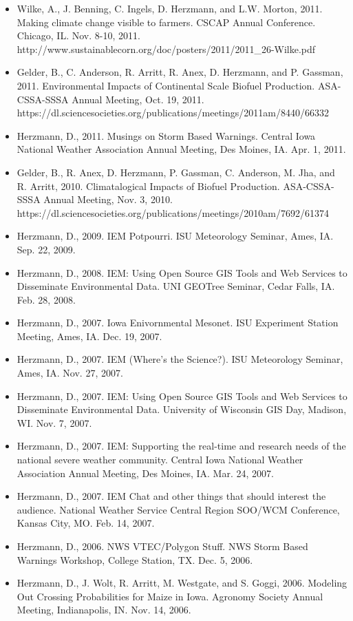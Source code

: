 \begin{itemize}
\item Wilke, A., J. Benning, C. Ingels, D. Herzmann, and L.W. Morton, 2011. Making climate change visible to farmers. CSCAP Annual Conference. Chicago, IL. Nov. 8-10, 2011.\\
http://www.sustainablecorn.org/doc/posters/2011/2011\_26-Wilke.pdf
\item Gelder, B., C. Anderson, R. Arritt, R. Anex, D. Herzmann, and P. Gassman, 2011. Environmental Impacts of Continental Scale Biofuel Production.  ASA-CSSA-SSSA Annual Meeting, Oct. 19, 2011. https://dl.sciencesocieties.org/publications/meetings/2011am/8440/66332
\item Herzmann, D., 2011. Musings on Storm Based Warnings. Central Iowa National Weather Association Annual Meeting, Des Moines, IA. Apr. 1, 2011.
\item Gelder, B., R. Anex, D. Herzmann, P. Gassman, C. Anderson, M. Jha, and R. Arritt, 2010. Climatalogical Impacts of Biofuel Production. ASA-CSSA-SSSA Annual Meeting, Nov. 3, 2010. https://dl.sciencesocieties.org/publications/meetings/2010am/7692/61374
\item Herzmann, D., 2009. IEM Potpourri. ISU Meteorology Seminar, Ames, IA. Sep. 22, 2009.
\item Herzmann, D., 2008. IEM: Using Open Source GIS Tools and Web Services to Disseminate Environmental Data. UNI GEOTree Seminar, Cedar Falls, IA. Feb. 28, 2008.
\item Herzmann, D., 2007. Iowa Enivornmental Mesonet. ISU Experiment Station Meeting, Ames, IA. Dec. 19, 2007.
\item Herzmann, D., 2007. IEM (Where's the Science?). ISU Meteorology Seminar, Ames, IA. Nov. 27, 2007.
\item Herzmann, D., 2007. IEM: Using Open Source GIS Tools and Web Services to Disseminate Environmental Data. University of Wisconsin GIS Day, Madison, WI. Nov. 7, 2007.
\item Herzmann, D., 2007. IEM: Supporting the real-time and research needs of the national severe weather community. Central Iowa National Weather Association Annual Meeting, Des Moines, IA. Mar. 24, 2007.
\item Herzmann, D., 2007. IEM Chat and other things that should interest the audience. National Weather Service Central Region SOO/WCM Conference, Kansas City, MO. Feb. 14, 2007.
\item Herzmann, D., 2006. NWS VTEC/Polygon Stuff. NWS Storm Based Warnings Workshop, College Station, TX. Dec. 5, 2006.
\item Herzmann, D., J. Wolt, R. Arritt, M. Westgate, and S. Goggi, 2006. Modeling Out Crossing Probabilities for Maize in Iowa. Agronomy Society Annual Meeting, Indianapolis, IN. Nov. 14, 2006.

\end{itemize}
